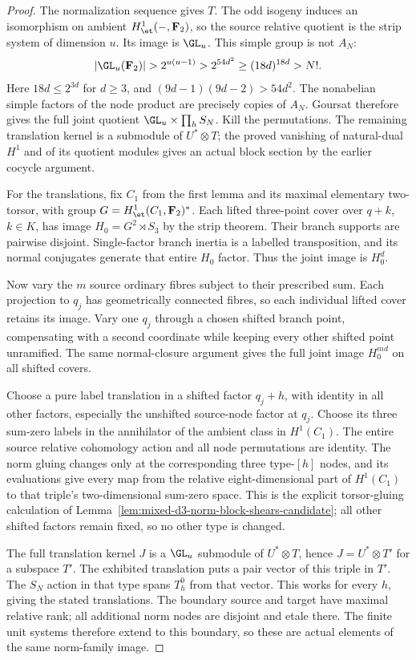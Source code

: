 \begin{proof}
The normalization sequence gives $T$. The odd isogeny induces
an isomorphism on ambient $H^1_{\et}(-,\mathbf F_2)$, so the
source relative quotient is the strip system of dimension $u$.
Its image is $\GL_u$. This simple group is not $A_N$:
\[
 |\GL_u(\mathbf F_2)|>2^{u(u-1)}>2^{54d^2}
       \geq(18d)^{18d}>N!.
\]
Here $18d\leq2^{3d}$ for $d\geq3$, and
$(9d-1)(9d-2)>54d^2$. The nonabelian simple factors of the
node product are precisely copies of $A_N$. Goursat therefore
gives the full joint quotient
$\GL_u\times\prod_hS_N$. Kill the permutations. The remaining
translation kernel is a submodule of $U^*\otimes T$; the proved
vanishing of natural-dual $H^1$ and of its quotient modules
gives an actual block section by the earlier cocycle argument.

For the translations, fix $C_1$ from the first lemma and its
maximal elementary two-torsor, with group
$G=H^1_{\et}(C_1,\mathbf F_2)^*$. Each lifted three-point cover
over $q+k$, $k\in K$, has image $H_0=G^2\rtimes S_3$ by the
strip theorem. Their branch supports are pairwise disjoint.
Single-factor branch inertia is a labelled transposition, and
its normal conjugates generate that entire $H_0$ factor.
Thus the joint image is $H_0^d$.

Now vary the $m$ source ordinary fibres subject to their prescribed
sum. Each projection to $q_j$ has geometrically connected fibres,
so each individual lifted cover retains its image. Vary one
$q_j$ through a chosen shifted branch point, compensating with
a second coordinate while keeping every other shifted point
unramified. The same normal-closure argument gives the full
joint image $H_0^{md}$ on all shifted covers.

Choose a pure label translation in a shifted factor $q_j+h$,
with identity in all other factors, especially the unshifted
source-node factor at $q_j$. Choose its three sum-zero labels
in the annihilator of the ambient class in $H^1(C_1)$.
The entire source relative cohomology action and all node
permutations are identity. The norm gluing changes only at
the corresponding three type-$[h]$ nodes, and its evaluations
give every map from the relative eight-dimensional part of
$H^1(C_1)$ to that triple's two-dimensional sum-zero space.
This is the explicit torsor-gluing calculation of
Lemma~\ref{lem:mixed-d3-norm-block-shears-candidate}; all other
shifted factors remain fixed, so no other type is changed.

The full translation kernel $J$ is a $\GL_u$ submodule of
$U^*\otimes T$, hence $J=U^*\otimes T'$ for a subspace $T'$.
The exhibited translation puts a pair vector of this triple
in $T'$. The $S_N$ action in that type spans $T_h^0$ from that
vector. This works for every $h$, giving the stated translations.
The boundary source and target have maximal relative rank;
all additional norm nodes are disjoint and etale there.
The finite unit systems therefore extend to this boundary, so
these are actual elements of the same norm-family image.
\end{proof}

